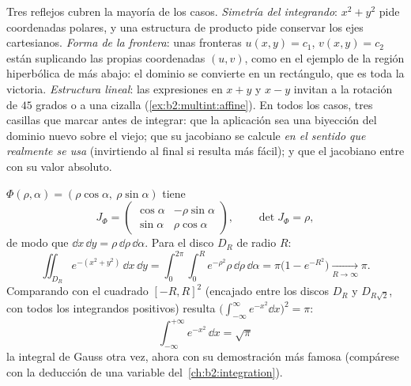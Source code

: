 \begin{remark}
Tres reflejos cubren la mayoría de los casos. \emph{Simetría del
integrando}: $x^2 + y^2$ pide coordenadas polares, y una estructura
de producto pide conservar los ejes cartesianos. \emph{Forma de la
frontera}: unas fronteras $u(x,y) = c_1$, $v(x,y) = c_2$ están
suplicando las propias coordenadas $(u, v)$, como en el ejemplo de la
región hiperbólica de más abajo: el dominio se convierte en un
rectángulo, que es toda la victoria. \emph{Estructura lineal}: las
expresiones en $x + y$ y $x - y$ invitan a la rotación de $45$ grados
o a una cizalla (\cref{ex:b2:multint:affine}). En todos los casos,
tres casillas que marcar antes de integrar: que la aplicación sea una
biyección del dominio nuevo sobre el viejo; que su jacobiano se
calcule \emph{en el sentido que realmente se usa} (invirtiendo al
final si resulta más fácil); y que el jacobiano entre con su valor
absoluto.
\end{remark}

\begin{example}\label{ex:b2:multint:polar}
$\Phi(\rho, \alpha) = (\rho\cos\alpha,\ \rho\sin\alpha)$ tiene
\[
J_\Phi = \begin{pmatrix}
\cos\alpha & -\rho\sin\alpha\\
\sin\alpha & \rho\cos\alpha
\end{pmatrix},
\qquad \det J_\Phi = \rho ,
\]
de modo que $\dd x\,\dd y = \rho\,\dd\rho\,\dd\alpha$. Para el disco
$D_R$ de radio $R$:
\[
\iint_{D_R} e^{-(x^2 + y^2)}\,\dd x\,\dd y
= \int_0^{2\pi}\!\!\int_0^R e^{-\rho^2}\rho\,\dd\rho\,\dd\alpha
= \pi\bigl(1 - e^{-R^2}\bigr)
\xrightarrow[R\to\infty]{} \pi .
\]
Comparando con el cuadrado $[-R, R]^2$ (encajado entre los discos
$D_R$ y $D_{R\sqrt2}$, con todos los integrandos positivos) resulta
$\bigl(\int_{-\infty}^\infty e^{-x^2}\dd x\bigr)^2 = \pi$:
\[
\boxed{\ \int_{-\infty}^{+\infty} e^{-x^2}\,\dd x = \sqrt{\pi}\ }
\]
la integral de Gauss otra vez, ahora con su demostración más famosa
(compárese con la deducción de una variable del~\cref{ch:b2:integration}).
\end{example}

